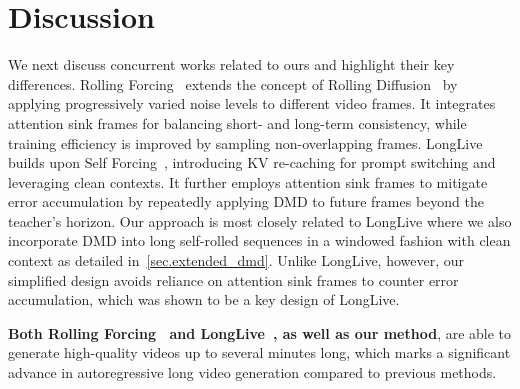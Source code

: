 \section{Discussion}
We next discuss concurrent works related to ours and highlight their key differences. Rolling Forcing~\cite{liu2025rollingforcingautoregressivelong} extends the concept of Rolling Diffusion~\cite{ruhe2024rollingdiffusionmodels} by applying progressively varied noise levels to different video frames. It integrates attention sink frames for balancing short- and long-term consistency, while training efficiency is improved by sampling non-overlapping frames. LongLive~\cite{yang2025longlive} builds upon Self Forcing~\cite{huang2025self}, introducing KV re-caching for prompt switching and leveraging clean contexts. It further employs attention sink frames to mitigate error accumulation by repeatedly applying DMD to future frames beyond the teacher’s horizon. Our approach is most closely related to LongLive where we also incorporate DMD into long self-rolled sequences in a windowed fashion with clean context as detailed in~\cref{sec.extended_dmd}. Unlike LongLive, however, our simplified design avoids reliance on attention sink frames to counter error accumulation, which was shown to be a key design of LongLive.

\textbf{Both Rolling Forcing~\cite{liu2025rollingforcingautoregressivelong} and LongLive~\cite{yang2025longlive}, as well as our method}, are able to generate high-quality videos up to several minutes long, which marks a significant advance in autoregressive long video generation compared to previous methods.


